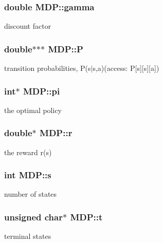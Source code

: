\subsubsection[{\texorpdfstring{gamma}{gamma}}]{\setlength{\rightskip}{0pt plus 5cm}double M\+D\+P\+::gamma}\hypertarget{structMDP_a250e0cbf0b71eef0f71af97ca6773ff2}{}\label{structMDP_a250e0cbf0b71eef0f71af97ca6773ff2}
discount factor 
\subsubsection[{\texorpdfstring{P}{P}}]{\setlength{\rightskip}{0pt plus 5cm}double$\ast$$\ast$$\ast$ M\+D\+P\+::P}\hypertarget{structMDP_a752db5e631de22e825b77dd4e052b195}{}\label{structMDP_a752db5e631de22e825b77dd4e052b195}
transition probabilities, P(s\textquotesingle{}$\vert$s,a)(access\+: P\mbox{[}s\textquotesingle{}\mbox{]}\mbox{[}s\mbox{]}\mbox{[}a\mbox{]}) 
\subsubsection[{\texorpdfstring{pi}{pi}}]{\setlength{\rightskip}{0pt plus 5cm}int$\ast$ M\+D\+P\+::pi}\hypertarget{structMDP_aeba26ff8087d7dc83fda5bd779965928}{}\label{structMDP_aeba26ff8087d7dc83fda5bd779965928}
the optimal policy 
\subsubsection[{\texorpdfstring{r}{r}}]{\setlength{\rightskip}{0pt plus 5cm}double$\ast$ M\+D\+P\+::r}\hypertarget{structMDP_a723a197ba7bcb6bc88e06cbee769166c}{}\label{structMDP_a723a197ba7bcb6bc88e06cbee769166c}
the reward r(s) 
\subsubsection[{\texorpdfstring{s}{s}}]{\setlength{\rightskip}{0pt plus 5cm}int M\+D\+P\+::s}\hypertarget{structMDP_aa735fb802768fb82ff8e05eb9d99ef51}{}\label{structMDP_aa735fb802768fb82ff8e05eb9d99ef51}
number of states 
\subsubsection[{\texorpdfstring{t}{t}}]{\setlength{\rightskip}{0pt plus 5cm}unsigned char$\ast$ M\+D\+P\+::t}\hypertarget{structMDP_a70ae114113478796bd398bca88f32aa1}{}\label{structMDP_a70ae114113478796bd398bca88f32aa1}
terminal states 
